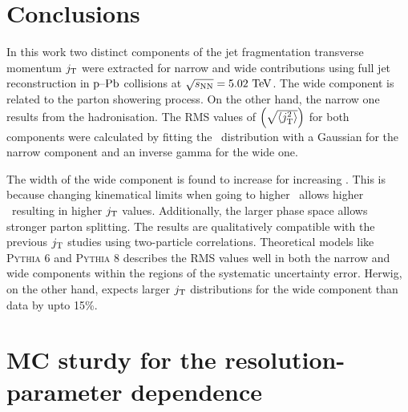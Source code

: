 





\section{Conclusions}
\label{sec:summary}
In this work two distinct components of the jet fragmentation transverse momentum $j_{\rm T}$ were extracted for narrow and wide contributions using full jet reconstruction in $\mbox{p--Pb}$ collisions at $\sqrt{s_{\mathrm{NN}}} = 5.02~\mathrm{TeV}$. The wide component is related to the parton showering process. On the other hand, the narrow one results from the hadronisation. 
The RMS values of \jt{} $\left(\sqrt{\left<j_{\rm T}^2\right>}\right)$ for both components were calculated by fitting the \jt\ distribution with a Gaussian for the narrow component and an inverse gamma for the wide one.

The width of the wide component is found to increase for increasing \ptjet. This is because changing kinematical limits when going to higher \ptjet\ allows higher \pttrack\ resulting in higher $j_{\rm T}$ values. Additionally, the larger phase space allows stronger parton splitting. The results are qualitatively compatible with the previous $j_{\rm T}$ studies using two-particle correlations. Theoretical models like \textsc{Pythia} 6 and \textsc{Pythia} 8 describes the RMS values well in both the narrow and wide components within the regions of the systematic uncertainty error. Herwig, on the other hand, expects larger $j_{\rm T}$ distributions for the wide component than data by upto 15\%.
 


\newpage
\appendix
\section{MC sturdy for the resolution-parameter dependence}
\label{A:Rdependence}

